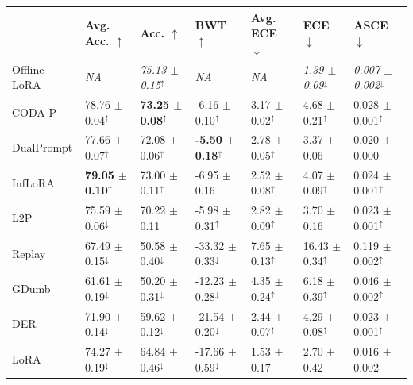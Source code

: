 \begin{tabular}{lllllll}
\toprule
 & {\small Avg. Acc. $\uparrow$} & {\small Acc. $\uparrow$} & {\small BWT $\uparrow$} & {\small Avg. ECE $\downarrow$} & {\small ECE $\downarrow$} & {\small ASCE $\downarrow$} \\
\midrule
Offline LoRA & {\small \textit{NA}} & \small \textit{75.13 $\pm$ 0.15}$^{\uparrow}$ & {\small \textit{NA}} & {\small \textit{NA}} & \small \textit{1.39 $\pm$ 0.09}$^{\downarrow}$ & \small \textit{0.007 $\pm$ 0.002}$^{\downarrow}$ \\
CODA-P & \small 78.76 $\pm$ 0.04$^{\uparrow}$ & \small \textbf{73.25 $\pm$ 0.08}$^{\uparrow}$ & \small -6.16 $\pm$ 0.10$^{\uparrow}$ & \small 3.17 $\pm$ 0.02$^{\uparrow}$ & \small 4.68 $\pm$ 0.21$^{\uparrow}$ & \small 0.028 $\pm$ 0.001$^{\uparrow}$ \\
DualPrompt & \small 77.66 $\pm$ 0.07$^{\uparrow}$ & \small 72.08 $\pm$ 0.06$^{\uparrow}$ & \small \textbf{-5.50 $\pm$ 0.18}$^{\uparrow}$ & \small 2.78 $\pm$ 0.05$^{\uparrow}$ & \small 3.37 $\pm$ 0.06 & \small 0.020 $\pm$ 0.000 \\
InfLoRA & \small \textbf{79.05 $\pm$ 0.10}$^{\uparrow}$ & \small 73.00 $\pm$ 0.11$^{\uparrow}$ & \small -6.95 $\pm$ 0.16 & \small 2.52 $\pm$ 0.08$^{\uparrow}$ & \small 4.07 $\pm$ 0.09$^{\uparrow}$ & \small 0.024 $\pm$ 0.001$^{\uparrow}$ \\
L2P & \small 75.59 $\pm$ 0.06$^{\downarrow}$ & \small 70.22 $\pm$ 0.11 & \small -5.98 $\pm$ 0.31$^{\uparrow}$ & \small 2.82 $\pm$ 0.09$^{\uparrow}$ & \small 3.70 $\pm$ 0.16 & \small 0.023 $\pm$ 0.001$^{\uparrow}$ \\
Replay & \small 67.49 $\pm$ 0.15$^{\downarrow}$ & \small 50.58 $\pm$ 0.40$^{\downarrow}$ & \small -33.32 $\pm$ 0.33$^{\downarrow}$ & \small 7.65 $\pm$ 0.13$^{\uparrow}$ & \small 16.43 $\pm$ 0.34$^{\uparrow}$ & \small 0.119 $\pm$ 0.002$^{\uparrow}$ \\
GDumb & \small 61.61 $\pm$ 0.19$^{\downarrow}$ & \small 50.20 $\pm$ 0.31$^{\downarrow}$ & \small -12.23 $\pm$ 0.28$^{\downarrow}$ & \small 4.35 $\pm$ 0.24$^{\uparrow}$ & \small 6.18 $\pm$ 0.39$^{\uparrow}$ & \small 0.046 $\pm$ 0.002$^{\uparrow}$ \\
DER & \small 71.90 $\pm$ 0.14$^{\downarrow}$ & \small 59.62 $\pm$ 0.12$^{\downarrow}$ & \small -21.54 $\pm$ 0.20$^{\downarrow}$ & \small 2.44 $\pm$ 0.07$^{\uparrow}$ & \small 4.29 $\pm$ 0.08$^{\uparrow}$ & \small 0.023 $\pm$ 0.001$^{\uparrow}$ \\
LoRA & \small 74.27 $\pm$ 0.19$^{\downarrow}$ & \small 64.84 $\pm$ 0.46$^{\downarrow}$ & \small -17.66 $\pm$ 0.59$^{\downarrow}$ & \small 1.53 $\pm$ 0.17 & \small 2.70 $\pm$ 0.42 & \small 0.016 $\pm$ 0.002 \\

\end{tabular}
